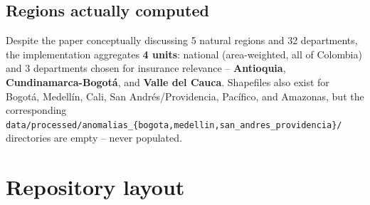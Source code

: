 \documentclass[11pt]{article}
\begin{document}
\subsection{Regions actually computed}
\label{sec:aci-co-target}

Despite the paper conceptually discussing 5 natural regions and 32
departments, the implementation aggregates \textbf{4 units}: national
(area-weighted, all of Colombia) and 3 departments chosen for insurance
relevance -- \textbf{Antioquia}, \textbf{Cundinamarca-Bogot\'a}, and
\textbf{Valle del Cauca}. Shapefiles also exist for Bogot\'a, Medell\'in,
Cali, San Andr\'es/Providencia, Pac\'ifico, and Amazonas, but the
corresponding \texttt{data/processed/anomalias\_\{bogota,medellin,\allowbreak san\_andres\_providencia\}/}
directories are empty -- never populated.

\section{Repository layout}
\end{document}
